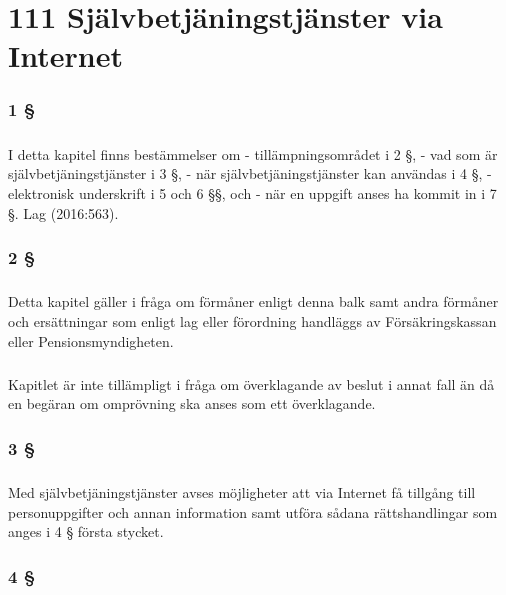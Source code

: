 \documentclass[a4paper,notitlepage,openany,10pt]{book}
\begin{document}
\chapter*{111 Självbetjäningstjänster via Internet}
\subsection*{1 §}
\paragraph*{}
I detta kapitel finns bestämmelser om
\newline - tillämpningsområdet i 2 §,
\newline - vad som är självbetjäningstjänster i 3 §,
\newline - när självbetjäningstjänster kan användas i 4 §,
\newline - elektronisk underskrift i 5 och 6 §§, och
\newline - när en uppgift anses ha kommit in i 7 §.
Lag (2016:563).
\subsection*{2 §}
\paragraph*{}
Detta kapitel gäller i fråga om förmåner enligt denna balk samt andra förmåner och ersättningar som enligt lag eller förordning handläggs av Försäkringskassan eller Pensionsmyndigheten.
\paragraph*{}
Kapitlet är inte tillämpligt i fråga om överklagande av beslut i annat fall än då en begäran om omprövning ska anses som ett överklagande.
\subsection*{3 §}
\paragraph*{}
Med självbetjäningstjänster avses möjligheter att via Internet få tillgång till personuppgifter och annan information samt utföra sådana rättshandlingar som anges i 4 § första stycket.
\subsection*{4 §}
\end{document}
